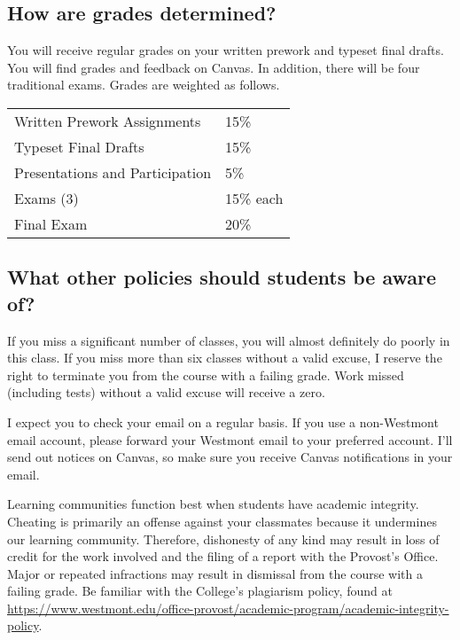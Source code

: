 \documentclass[
  twoside]{article}
\begin{document}
\hypertarget{how-are-grades-determined}{%
\subsection{How are grades
determined?}\label{how-are-grades-determined}}

You will receive regular grades on your written prework and typeset
final drafts. You will find grades and feedback on Canvas. In addition,
there will be four traditional exams. Grades are weighted as follows.

\begin{tabular}[t]{ll}
\toprule
Written Prework Assignments & 15\%\\
Typeset Final Drafts & 15\%\\
Presentations and Participation & 5\%\\
Exams (3) & 15\% each\\
Final Exam & 20\%\\
\bottomrule
\end{tabular}

\hypertarget{what-other-policies-should-students-be-aware-of}{%
\subsection{What other policies should students be aware
of?}\label{what-other-policies-should-students-be-aware-of}}

If you miss a significant number of classes, you will almost definitely
do poorly in this class. If you miss more than six classes without a
valid excuse, I reserve the right to terminate you from the course with
a failing grade. Work missed (including tests) without a valid excuse
will receive a zero.

I expect you to check your email on a regular basis. If you use a
non-Westmont email account, please forward your Westmont email to your
preferred account. I'll send out notices on Canvas, so make sure you
receive Canvas notifications in your email.

Learning communities function best when students have academic
integrity. Cheating is primarily an offense against your classmates
because it undermines our learning community. Therefore, dishonesty of
any kind may result in loss of credit for the work involved and the
filing of a report with the Provost's Office. Major or repeated
infractions may result in dismissal from the course with a failing
grade. Be familiar with the College's plagiarism policy, found at
\url{https://www.westmont.edu/office-provost/academic-program/academic-integrity-policy}.
\end{document}
